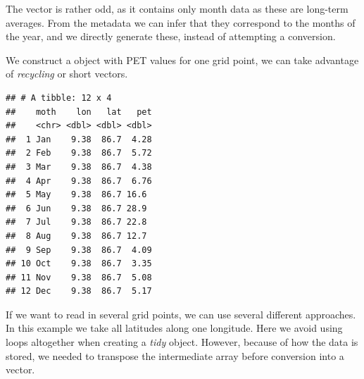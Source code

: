 \documentclass[krantz2]{krantz}\usepackage{knitr}%
\begin{document}
The  vector is rather odd, as it contains only month data as these are long-term averages. From the metadata we can infer that they correspond to the months of the year, and we directly generate these, instead of attempting a conversion.

We construct a  object with PET values for one grid point, we can take advantage of \emph{recycling} or short vectors.

\begin{knitrout}\footnotesize
{}\color{fgcolor}\begin{kframe}
\begin{alltt}
 \hlkwb{<-}
    \hlstd{(} \hlstd{= month.abb[}\hlopt{:}\hlstd{],}
            \hlstd{= longitude[}\hlstd{],}
            \hlstd{= latitude[}\hlstd{],}
            \hlstd{=}  \hlstd{)[}\hlstd{,} \hlstd{, ]}
           \hlstd{)}
\end{alltt}
\begin{verbatim}
## # A tibble: 12 x 4
##    moth    lon   lat   pet
##    <chr> <dbl> <dbl> <dbl>
##  1 Jan    9.38  86.7  4.28
##  2 Feb    9.38  86.7  5.72
##  3 Mar    9.38  86.7  4.38
##  4 Apr    9.38  86.7  6.76
##  5 May    9.38  86.7 16.6 
##  6 Jun    9.38  86.7 28.9 
##  7 Jul    9.38  86.7 22.8 
##  8 Aug    9.38  86.7 12.7 
##  9 Sep    9.38  86.7  4.09
## 10 Oct    9.38  86.7  3.35
## 11 Nov    9.38  86.7  5.08
## 12 Dec    9.38  86.7  5.17
\end{verbatim}
\end{kframe}
\end{knitrout}

If we want to read in several grid points, we can use several different approaches. In this example we take all latitudes along one longitude. Here we avoid using loops altogether when creating a \emph{tidy}  object. However, because of how the data is stored, we needed to transpose the intermediate array before conversion into a vector.
\end{document}
